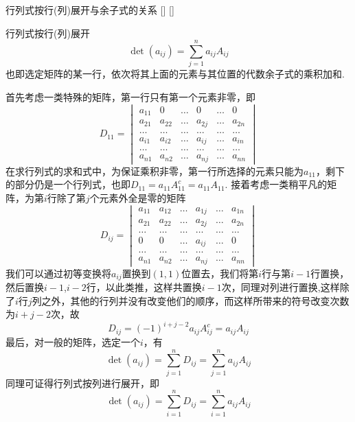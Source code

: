\documentclass[UTF8]{ctexart}
\begin{document}
    \begin{thm}
			[]
			{行列式按行(列)展开与余子式的关系}
			[]
			[]

        行列式按行(列)展开\[
            \det(a_{ij})=\sum_{j=1}^na_{ij}A_{ij}\]
            也即选定矩阵的某一行，依次将其上面的元素与其位置的代数余子式的乘积加和.
    \end{thm}
    \begin{prf}
        首先考虑一类特殊的矩阵，第一行只有第一个元素非零，即\[
        D_{11}=
        \begin{vmatrix}
        a_{11} & 0 & \ldots & 0 & \ldots & 0 \\
        a_{21} & a_{22} & \ldots & a_{2j} & \ldots & a_{2n} \\
        \ldots & \ldots & \ldots & \ldots & \ldots & \ldots \\
        a_{i1} & a_{i2} & \ldots & a_{ij} & \ldots & a_{in} \\
        \ldots & \ldots & \ldots & \ldots & \ldots & \ldots \\
        a_{n1} & a_{n2} & \ldots & a_{nj} & \ldots & a_{nn}
        \end{vmatrix}
            \]
        在求行列式的求和式中，为保证乘积非零，第一行所选择的元素只能为$a_{11}$，剩下的部分仍是一个行列式，也即$D_{11}=a_{11}A^{c}_{11}=a_{11}A_{11}$. 
        接着考虑一类稍平凡的矩阵，为第$i$行除了第$j$个元素外全是零的矩阵
        \[D_{ij}=
        \begin{vmatrix}
        a_{11} & a_{12} & \ldots & a_{1j} & \ldots & a_{1n} \\
        a_{21} & a_{22} & \ldots & a_{2j} & \ldots & a_{2n} \\
        \ldots & \ldots & \ldots & \ldots & \ldots & \ldots \\
        0 & 0 & \ldots & a_{ij} & \ldots & 0 \\
        \ldots & \ldots & \ldots & \ldots & \ldots & \ldots \\
        a_{n1} & a_{n2} & \ldots & a_{nj} & \ldots & a_{nn}
        \end{vmatrix}\]
        我们可以通过初等变换将$a_{ij}$置换到$(1,1)$位置去，我们将第$i$行与第$i-1$行置换，然后置换$i-1$,$i-2$行，以此类推，这样共置换$i-1$次，同理对列进行置换,这样除了$i$行$j$列之外，其他的行列并没有改变他们的顺序，而这样所带来的符号改变次数为$i+j-2$次，故\[D_{ij}=(-1)^{i+j-2}a_{ij}A^{c}_{ij}=a_{ij}A_{ij}\]
        最后，对一般的矩阵，选定一个$i$，有
        \[
        \det(a_{ij})=\sum_{j=1}^nD_{ij}=\sum_{j=1}^na_{ij}A_{ij}
        \]
        同理可证得行列式按列进行展开，即\[
        \det(a_{ij})=\sum_{i=1}^nD_{ij}=\sum_{i=1}^na_{ij}A_{ij}
        \]
        \end{prf}
\end{document}
